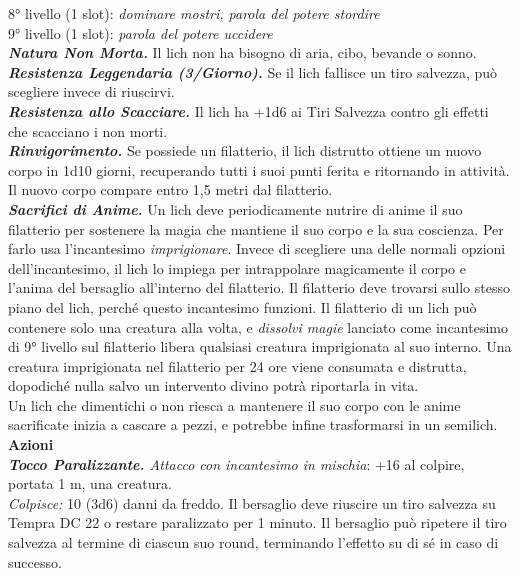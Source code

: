 \begin{multicols}{2}
8° livello (1 slot): \emph{dominare mostri, parola del potere stordire}\\
9° livello (1 slot): \emph{parola del potere uccidere}\\
\emph{\textbf{Natura Non Morta.}} Il lich non ha bisogno di aria, cibo, bevande o sonno.\\
\emph{\textbf{Resistenza Leggendaria (3/Giorno).}} Se il lich fallisce un tiro salvezza, può scegliere invece di riuscirvi.\\
\emph{\textbf{Resistenza allo Scacciare.}} Il lich ha +1d6 ai Tiri Salvezza contro gli effetti che scacciano i non morti.\\
\emph{\textbf{Rinvigorimento.}} Se possiede un filatterio, il lich distrutto ottiene un nuovo corpo in 1d10 giorni, recuperando tutti i suoi punti ferita e ritornando in attività. Il nuovo corpo compare entro 1,5 metri dal filatterio.\\

\emph{\textbf{Sacrifici di Anime.}} Un lich deve periodicamente nutrire di anime il suo filatterio per sostenere la magia che mantiene il suo corpo e la sua coscienza. Per farlo usa l'incantesimo \emph{imprigionare}. Invece di scegliere una delle normali opzioni dell'incantesimo, il lich lo impiega per intrappolare magicamente il corpo e l'anima del bersaglio all'interno del filatterio. Il filatterio deve trovarsi sullo stesso piano del lich, perché questo incantesimo funzioni. Il filatterio di un lich può contenere solo una creatura alla volta, e \emph{dissolvi magie} lanciato come incantesimo di 9° livello sul filatterio libera qualsiasi creatura imprigionata al suo interno. Una creatura imprigionata nel filatterio per 24 ore viene consumata e distrutta, dopodiché nulla salvo un intervento divino potrà riportarla in vita.\\
Un lich che dimentichi o non riesca a mantenere il suo corpo con le anime sacrificate inizia a cascare a pezzi, e potrebbe infine trasformarsi in un semilich.\\

\smallskip\textbf{Azioni}\\

\emph{\textbf{Tocco Paralizzante.} Attacco con incantesimo in mischia}: +16 al colpire, portata 1 m, una creatura.\\

\emph{Colpisce:} 10 (3d6) danni da freddo. Il bersaglio deve riuscire un tiro salvezza su Tempra DC  22 o restare paralizzato per 1 minuto. Il bersaglio può ripetere il tiro salvezza al termine di ciascun suo round, terminando l'effetto su di sé in caso di successo.\\


\end{multicols}
